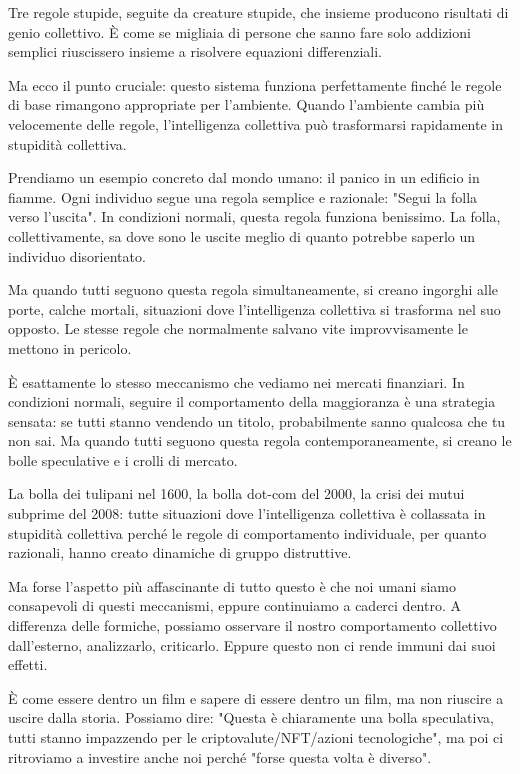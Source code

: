 Tre regole stupide, seguite da creature stupide, che insieme producono risultati di genio collettivo. È come se migliaia di persone che sanno fare solo addizioni semplici riuscissero insieme a risolvere equazioni differenziali.

Ma ecco il punto cruciale: questo sistema funziona perfettamente finché le regole di base rimangono appropriate per l'ambiente. Quando l'ambiente cambia più velocemente delle regole, l'intelligenza collettiva può trasformarsi rapidamente in stupidità collettiva.

\medskip

Prendiamo un esempio concreto dal mondo umano: il panico in un edificio in fiamme. Ogni individuo segue una regola semplice e razionale: "Segui la folla verso l'uscita". In condizioni normali, questa regola funziona benissimo. La folla, collettivamente, sa dove sono le uscite meglio di quanto potrebbe saperlo un individuo disorientato.

Ma quando tutti seguono questa regola simultaneamente, si creano ingorghi alle porte, calche mortali, situazioni dove l'intelligenza collettiva si trasforma nel suo opposto. Le stesse regole che normalmente salvano vite improvvisamente le mettono in pericolo.

È esattamente lo stesso meccanismo che vediamo nei mercati finanziari. In condizioni normali, seguire il comportamento della maggioranza è una strategia sensata: se tutti stanno vendendo un titolo, probabilmente sanno qualcosa che tu non sai. Ma quando tutti seguono questa regola contemporaneamente, si creano le bolle speculative e i crolli di mercato.

La bolla dei tulipani nel 1600, la bolla dot-com del 2000, la crisi dei mutui subprime del 2008: tutte situazioni dove l'intelligenza collettiva è collassata in stupidità collettiva perché le regole di comportamento individuale, per quanto razionali, hanno creato dinamiche di gruppo distruttive.

\bigskip

Ma forse l'aspetto più affascinante di tutto questo è che noi umani siamo consapevoli di questi meccanismi, eppure continuiamo a caderci dentro. A differenza delle formiche, possiamo osservare il nostro comportamento collettivo dall'esterno, analizzarlo, criticarlo. Eppure questo non ci rende immuni dai suoi effetti.

È come essere dentro un film e sapere di essere dentro un film, ma non riuscire a uscire dalla storia. Possiamo dire: "Questa è chiaramente una bolla speculativa, tutti stanno impazzendo per le criptovalute/NFT/azioni tecnologiche", ma poi ci ritroviamo a investire anche noi perché "forse questa volta è diverso".

